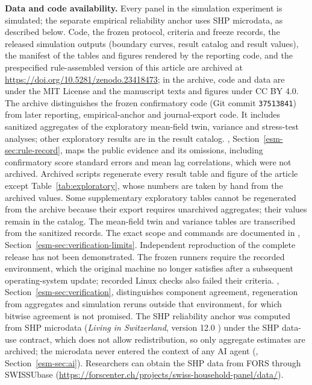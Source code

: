 \noindent\textbf{Data and code availability.}
Every panel in the simulation experiment is simulated; the separate empirical reliability anchor uses SHP microdata, as described below.
Code, the frozen protocol, criteria and freeze records, the released simulation outputs (boundary curves, result catalog and result values), the manifest of the tables and figures rendered by the reporting code, and the prespecified rule-assembled version of this article are archived at \url{https://doi.org/10.5281/zenodo.23418473}; in the archive, code and data are under the MIT License and the manuscript texts and figures under CC BY 4.0.
The archive distinguishes the frozen confirmatory code (Git commit \texttt{37513841}) from later reporting, empirical-anchor and journal-export code. It includes sanitized aggregates of the exploratory mean-field twin, variance and stress-test analyses; other exploratory results are in the result catalog. \esmresource, Section~\ref{esm-sec:rule-record}, maps the public evidence and its omissions, including confirmatory score standard errors and mean lag correlations, which were not archived.
Archived scripts regenerate every result table and figure of the article except Table~\ref{tab:exploratory}, whose numbers are taken by hand from the archived values. Some supplementary exploratory tables cannot be regenerated from the archive because their export requires unarchived aggregates; their values remain in the catalog. The mean-field twin and variance tables are transcribed from the sanitized records. The exact scope and commands are documented in \esmresource, Section~\ref{esm-sec:verification-limits}.
Independent reproduction of the complete release has not been demonstrated. The frozen runners require the recorded environment, which the original machine no longer satisfies after a subsequent operating-system update; recorded Linux checks also failed their criteria. \esmresource, Section~\ref{esm-sec:verification}, distinguishes component agreement, regeneration from aggregates and simulation reruns outside that environment, for which bitwise agreement is not promised.
The SHP reliability anchor was computed from SHP microdata (\emph{Living in Switzerland}, version 12.0 \cite{shpgroup2026data}) under the SHP data-use contract, which does not allow redistribution, so only aggregate estimates are archived; the microdata never entered the context of any AI agent (\esmresource, Section~\ref{esm-sec:ai}). Researchers can obtain the SHP data from FORS through SWISSUbase (\url{https://forscenter.ch/projects/swiss-household-panel/data/}).


